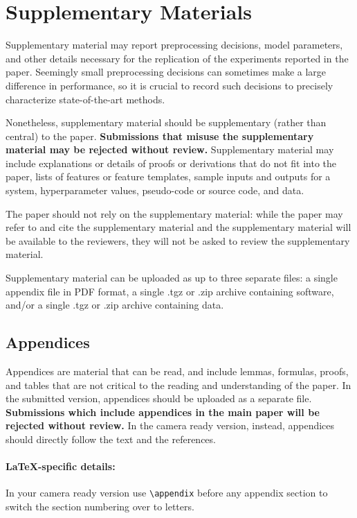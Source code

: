 \documentclass[11pt,a4paper]{article}
\begin{document}
\section{Supplementary Materials}
\label{sec:supplementary}

Supplementary material may report preprocessing decisions, model parameters, and other details necessary for the replication of the experiments reported in the paper.
Seemingly small preprocessing decisions can sometimes make a large difference in performance, so it is crucial to record such decisions to precisely characterize state-of-the-art methods. 

Nonetheless, supplementary material should be supplementary (rather than central) to the paper.
\textbf{Submissions that misuse the supplementary material may be rejected without review.}
Supplementary material may include explanations or details of proofs or derivations that do not fit into the paper, lists of
features or feature templates, sample inputs and outputs for a system, hyperparameter values, pseudo-code or source code, and data.

The paper should not rely on the supplementary material: while the paper may refer to and cite the supplementary material and the supplementary material will be available to the reviewers, they will not be asked to review the supplementary material.

Supplementary material can be uploaded as up to three separate files: a single appendix file in PDF format, a single .tgz or .zip archive containing software, and/or a single .tgz or .zip archive containing data.



\subsection{Appendices}
\label{sec:appendix}
Appendices are material that can be read, and include lemmas, formulas, proofs, and tables that are not critical to the reading and understanding of the paper. 
In the submitted version, appendices should be uploaded as a separate file. \textbf{Submissions which include appendices in the main paper will be rejected without review.} In the camera ready version, instead, appendices should directly follow the text and the references. 

\paragraph{\LaTeX-specific details:}
In your camera ready version use {\small\verb|\appendix|} before any appendix section to switch the section numbering over to letters.
\end{document}
